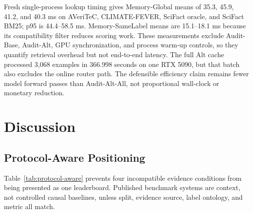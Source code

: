 \documentclass[runningheads]{llncs}
\begin{document}
Fresh single-process lookup timing gives Memory-Global means of 35.3, 45.9, 41.2, and
40.3 ms on AVeriTeC, CLIMATE-FEVER, SciFact oracle, and SciFact BM25; p95 is
44.4--58.5 ms. Memory-SameLabel means are 15.1--18.1 ms because its compatibility
filter reduces scoring work. These measurements exclude Audit-Base, Audit-Alt, GPU
synchronization, and process warm-up controls, so they quantify retrieval
overhead but not end-to-end latency. The full Alt cache processed 3,068 examples
in 366.998 seconds on one RTX 5090, but that batch also excludes the online
router path. The defensible efficiency claim remains fewer model forward
passes than Audit-Alt-All, not proportional wall-clock or monetary reduction.

\section{Discussion}

\subsection{Protocol-Aware Positioning}

Table~\ref{tab:protocol-aware} prevents four incompatible evidence conditions
from being presented as one leaderboard. Published benchmark systems are
context, not controlled causal baselines, unless split, evidence source,
label ontology, and metric all match.

\begin{table}[t]
\caption{Protocol-aware comparison. A dash means that the metric is absent or
not comparable under the cited protocol, not a score of zero.}
\label{tab:protocol-aware}
\centering\scriptsize
{}
\end{table}
\end{document}
